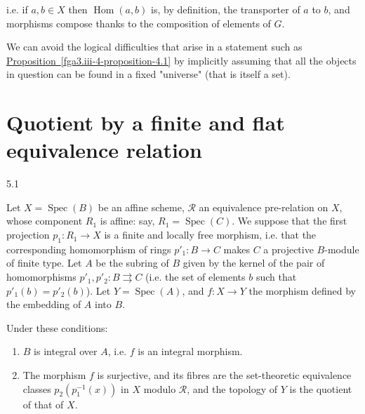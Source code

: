   i.e. if \(a,b\in  X\) then \(\operatorname {Hom}(a,b)\) is, by definition, the transporter of \(a\) to \(b\), and morphisms compose thanks to the composition of elements of \(G\).\begin{remark}{}\label{fga3.iii-4-remark}\skipsinglepar\par{}We can avoid the logical difficulties that arise in a statement such as \hyperref[fga3.iii-4-proposition-4.1]{Proposition~\ref*{fga3.iii-4-proposition-4.1}} by implicitly assuming that all the objects in question can be found in a fixed "universe" (that is itself a set).\end{remark}\chapter{Quotient by a finite and flat equivalence relation}\thispagestyle{fancy}\label{fga3.iii-5}\begin{theorem}{5.1}\label{fga3.iii-5-theorem-5.1}\skipsinglepar\par{}Let \(X=\operatorname {Spec}(B)\) be an affine scheme, \(\mathcal {R}\) an equivalence pre-relation on \(X\), whose component \(R_1\) is affine: say, \(R_1=\operatorname {Spec}(C)\).
    We suppose that the first projection \(p_1\colon  R_1\to  X\) is a finite and locally free morphism, i.e. that the corresponding homomorphism of rings \(p'_1\colon  B\to  C\) makes \(C\) a projective \(B\)-module of finite type.
    Let \(A\) be the subring of \(B\) given by the kernel of the pair of homomorphisms \(p'_1,p'_2\colon  B\rightrightarrows  C\) (i.e. the set of elements \(b\) such that \(p'_1(b)=p'_2(b)\)).
    Let \(Y=\operatorname {Spec}(A)\), and \(f\colon  X\to  Y\) the morphism defined by the embedding of \(A\) into \(B\).
    
    Under these conditions:

    
 \begin{enumerate}
      
 \item[i.]
        \(B\) is integral over \(A\), i.e. \(f\) is an integral morphism.
      


      
 \item[ii.]
        The morphism \(f\) is surjective, and its fibres are the set-theoretic equivalence classes \(p_2(p_1^{-1}(x))\) in \(X\) modulo \(\mathcal {R}\), and the topology of \(Y\) is the quotient of that of \(X\).
      



\end{enumerate}
\end{theorem}
